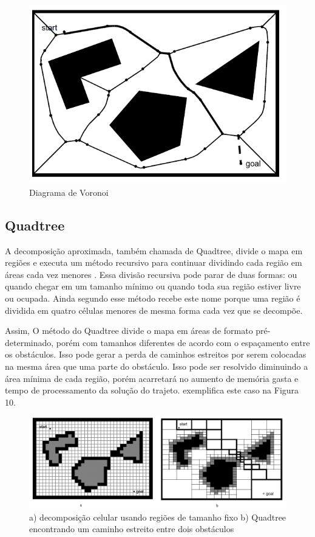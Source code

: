 \begin{figure}[h]
	\centering
	\label{fig09}
		\includegraphics[keepaspectratio=true,scale=0.6]{figuras/8voronoi.png}
	\caption{Diagrama de Voronoi \cite{Siegwart2004}}
\end{figure}

\subsection{Quadtree}

A decomposição aproximada, também chamada de Quadtree, divide o mapa em regiões e executa um método recursivo para continuar dividindo cada região em áreas cada vez menores \cite{Thomsen2010}. Essa divisão recursiva pode parar de duas formas: ou quando chegar em um tamanho mínimo ou quando toda sua região estiver livre ou ocupada. Ainda segundo \cite{Thomsen2010} esse método recebe este nome porque uma região é dividida em quatro células menores de mesma forma cada vez que se decompõe.

Assim, O método do Quadtree divide o mapa em áreas de formato pré-determinado, porém com tamanhos diferentes de acordo com o espaçamento entre os obstáculos. Isso pode gerar a perda de caminhos estreitos por serem colocadas na mesma área que uma parte do obstáculo. Isso pode ser resolvido diminuindo a área mínima de cada região, porém acarretará no aumento de memória gasta e tempo de processamento da solução do trajeto. \cite{Siegwart2004} exemplifica este caso na Figura 10.

\begin{figure}[h]
	\centering
	\label{fig10}
		\includegraphics[keepaspectratio=true,scale=0.5]{figuras/9quadtree.png}
	\caption{ a) decomposição celular usando regiões de tamanho fixo b) Quadtree encontrando um caminho estreito entre dois obstáculos \cite{Siegwart2004}}
\end{figure}

